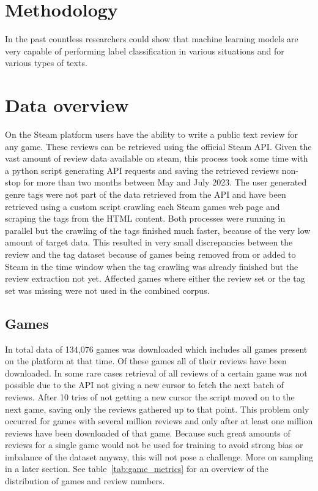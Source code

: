 \documentclass[11pt, a4paper]{article}
\begin{document}
\section{Methodology}\label{sec:methodology}
In the past countless researchers could show that machine learning models are very capable of performing label
classification in various situations and for various types of texts.


\section{Data overview}\label{sec:data-overview}
On the Steam platform users have the ability to write a public text review for any game.
These reviews can be retrieved using the official Steam API.
Given the vast amount of review data available on steam, this process took some time with a python script generating
API requests and saving the retrieved reviews non-stop for more than two months between May and July 2023.
The user generated genre tags were not part of the data retrieved from the API and have been retrieved using a custom
script crawling each Steam games web page and scraping the tags from the HTML content.
Both processes were running in parallel but the crawling of the tags finished much faster, because of the very low
amount of target data.
This resulted in very small discrepancies between the review and the tag dataset because of games being removed from
or added to Steam in the time window when the tag crawling was already finished but the review extraction not yet.
Affected games where either the review set or the tag set was missing were not used in the combined corpus.

\subsection{Games}\label{subsec:games}
In total data of 134,076 games was downloaded which includes all games present on the platform at that time.
Of these games all of their reviews have been downloaded.
In some rare cases retrieval of all reviews of a certain game was not possible due to the API not giving a new cursor
to fetch the next batch of reviews.
After 10 tries of not getting a new cursor the script moved on to the next game, saving only the reviews gathered up
to that point.
This problem only occurred for games with several million reviews and only after at least one million reviews have
been downloaded of that game.
Because such great amounts of reviews for a single game would not be used for training to avoid strong bias or
imbalance of the dataset anyway, this will not pose a challenge.
More on sampling in a later section.
See table~\ref{tab:game_metrics} for an overview of the distribution of games and review numbers.
\end{document}
